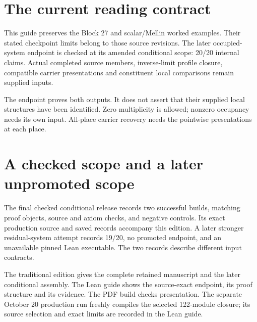 \documentclass[12pt,a4paper]{article}
\begin{document}
\KomorebiCover
{}

\section*{The current reading contract}
This guide preserves the Block 27 and scalar/Mellin worked examples. Their stated checkpoint limits belong to those source revisions. The later occupied-system endpoint is checked at its amended conditional scope: 20/20 internal claims. Actual completed source members, inverse-limit profile closure, compatible carrier presentations and constituent local comparisons remain supplied inputs.
\begin{center}
\end{center}
The endpoint proves both outputs. It does not assert that their supplied local structures have been identified. Zero multiplicity is allowed; nonzero occupancy needs its own input. All-place carrier recovery needs the pointwise presentations at each place.
\clearpage
\section*{A checked scope and a later unpromoted scope}
The final checked conditional release records two successful builds, matching proof objects, source and axiom checks, and negative controls. Its exact production source and saved records accompany this edition. A later stronger residual-system attempt records 19/20, no promoted endpoint, and an unavailable pinned Lean executable. The two records describe different input contracts.

The traditional edition gives the complete retained manuscript and the later conditional assembly. The Lean guide shows the source-exact endpoint, its proof structure and its evidence. The PDF build checks presentation. The separate October 20 production run freshly compiles the selected 122-module closure; its source selection and exact limits are recorded in the Lean guide.
\clearpage
\setcounter{page}{1}\renewcommand{\thepage}{V\arabic{page}}

\end{document}
